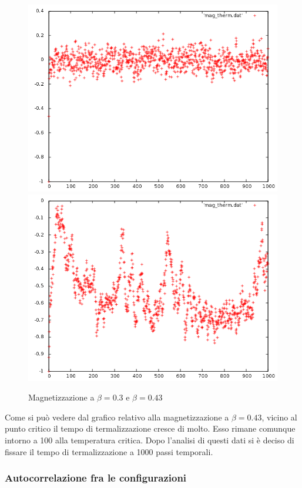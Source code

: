 \begin{figure}[h]
\includegraphics[scale=0.35]{metropolis/mag_therm.png}
\includegraphics[scale=0.35]{metropolis/mag_therm_crit.png}
\caption{Magnetizzazione a $\beta=0.3$ e $\beta=0.43$}
\end{figure}
Come si può vedere dal grafico relativo alla magnetizzazione a $\beta=0.43$, vicino al punto critico il tempo di termalizzazione cresce di molto. Esso rimane comunque intorno a 100 alla temperatura critica.
Dopo l'analisi di questi dati si è deciso di fissare il tempo di termalizzazione a 1000 passi temporali.

\subsubsection{Autocorrelazione fra le configurazioni}





